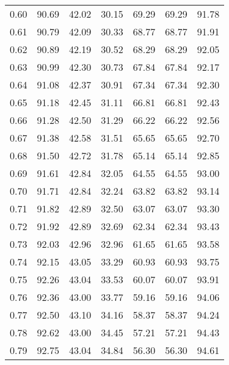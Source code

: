 \begin{tabular}{|c|c|c|c|c|c|c|}
      0.60 &     90.69 &     42.02 &      30.15 &   69.29 &      69.29 &         91.78 \\
      0.61 &     90.79 &     42.09 &      30.33 &   68.77 &      68.77 &         91.91 \\
      0.62 &     90.89 &     42.19 &      30.52 &   68.29 &      68.29 &         92.05 \\
      0.63 &     90.99 &     42.30 &      30.73 &   67.84 &      67.84 &         92.17 \\
      0.64 &     91.08 &     42.37 &      30.91 &   67.34 &      67.34 &         92.30 \\
      0.65 &     91.18 &     42.45 &      31.11 &   66.81 &      66.81 &         92.43 \\
      0.66 &     91.28 &     42.50 &      31.29 &   66.22 &      66.22 &         92.56 \\
      0.67 &     91.38 &     42.58 &      31.51 &   65.65 &      65.65 &         92.70 \\
      0.68 &     91.50 &     42.72 &      31.78 &   65.14 &      65.14 &         92.85 \\
      0.69 &     91.61 &     42.84 &      32.05 &   64.55 &      64.55 &         93.00 \\
      0.70 &     91.71 &     42.84 &      32.24 &   63.82 &      63.82 &         93.14 \\
      0.71 &     91.82 &     42.89 &      32.50 &   63.07 &      63.07 &         93.30 \\
      0.72 &     91.92 &     42.89 &      32.69 &   62.34 &      62.34 &         93.43 \\
      0.73 &     92.03 &     42.96 &      32.96 &   61.65 &      61.65 &         93.58 \\
      0.74 &     92.15 &     43.05 &      33.29 &   60.93 &      60.93 &         93.75 \\
      0.75 &     92.26 &     43.04 &      33.53 &   60.07 &      60.07 &         93.91 \\
      0.76 &     92.36 &     43.00 &      33.77 &   59.16 &      59.16 &         94.06 \\
      0.77 &     92.50 &     43.10 &      34.16 &   58.37 &      58.37 &         94.24 \\
      0.78 &     92.62 &     43.00 &      34.45 &   57.21 &      57.21 &         94.43 \\
      0.79 &     92.75 &     43.04 &      34.84 &   56.30 &      56.30 &         94.61 \\

\end{tabular}
